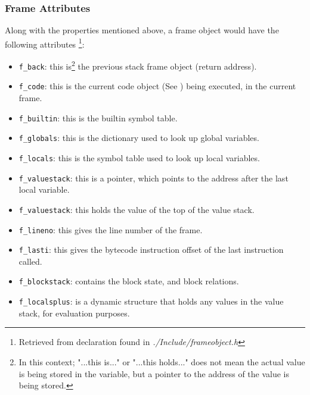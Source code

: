 {			\subsubsection*{Frame Attributes}
			\par Along with the properties mentioned above, a frame object would have the following attributes \footnote{Retrieved from declaration found in \textit{./Include/frameobject.h}}:
			\begin{itemize}
				\item \lstinline|f_back|: this is\footnote{\label{footnote:frame_obj_attribs}In this context; "...this is..." or "...this holds..." does not mean the actual value is being stored in the variable, but a pointer to the address of the value is being stored.} the previous stack frame object (return address).
				\item \lstinline|f_code|: this is the current code object (See {\bfseries{}}) being executed, in the current frame.
				\item \lstinline|f_builtin|: this is the builtin symbol table.
				\item \lstinline|f_globals|: this is the dictionary used to look up global variables.
				\item \lstinline|f_locals|: this is the symbol table used to look up local variables.
				\item \lstinline|f_valuestack|: this is a pointer, which points to the address after the last local variable.
				\item \lstinline|f_valuestack|: this holds the value of the top of the value stack.
				\item \lstinline|f_lineno|: this gives the line number of the frame.
				\item \lstinline|f_lasti|: this gives the bytecode instruction offset of the last instruction called.
				\item \lstinline|f_blockstack|: contains the block state, and block relations.
				\item \lstinline|f_localsplus|: is a dynamic structure that holds any values in the value stack, for evaluation purposes.
			\end{itemize}

}
